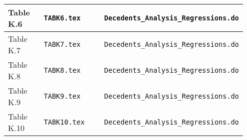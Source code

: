 \documentclass[a4,12p]{article}
\begin{document}
\begin{landscape}
\begin{table}[ht]
\begin{tabular}{p{0.20\linewidth} p{0.35\linewidth} p{0.40\linewidth}}
\midrule
Table K.6 & {\tt TABK6.tex} & {\tt Decedents\_Analysis\_Regressions.do} \\
\midrule
Table K.7 & {\tt TABK7.tex} & {\tt Decedents\_Analysis\_Regressions.do} \\
\midrule
Table K.8 & {\tt TABK8.tex} & {\tt Decedents\_Analysis\_Regressions.do} \\
\midrule
Table K.9 & {\tt TABK9.tex} & {\tt Decedents\_Analysis\_Regressions.do} \\
\midrule
Table K.10 & {\tt TABK10.tex} & {\tt Decedents\_Analysis\_Regressions.do} \\
\bottomrule
\end{tabular}
\end{table}
\end{landscape}
\end{document}
